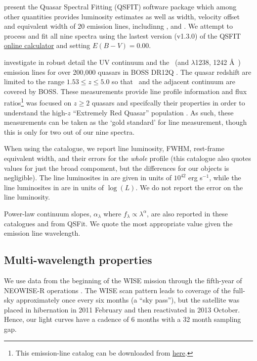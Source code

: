 \documentclass[a4paper,fleqn,usenatbib]{mnras}
\begin{document}
\citet{Calderone2017} present the Quasar Spectral Fitting (QSFIT)
software package which among other quantities provides luminosity
estimates as well as width, velocity offset and equivalent width of 20
emission lines, includinng \civ, \ciii and \mgii.  We attempt to process and fit
all nine spectra using the lastest version (v1.3.0) of the QSFIT
\href{https://qsfit.inaf.it/cat_1.30/onlinefit.php}{online calculator}
and setting $E(B-V)=0.00$.

\citet{Hamann2017} investigate in robust detail the UV continuum and
the \civ\ (and \nv $\lambda$1238, 1242 \AA\ ) emission lines for over
200,000 quasars in BOSS DR12Q \citep{Paris2017}.  The quasar redshift
are limited to the range $1.53 \leq z \leq 5.0$ so that \civ\ and the
adjacent continuum are covered by BOSS. These measurements provide
line profile information and flux ratios\footnote{This emission-line
catalog can be downloaded from
\href{https://datadryad.org/stash/dataset/doi:10.6086/D1H59V}{here}.}
\citet{Hamann2017} was focused on $z\geq2$ quasars and specifcally
their \civ properties in order to understand the high-$z$ ``Extremely
Red Quasar'' population \citet{Ross2015, Zakamska2016, Perrotta2019,
Zakamska2019}.  As such, these measurements can be taken as the `gold
standard' for \civ line measurement, though this is only for two out of
our nine spectra.

 When using the \citet{Shen2011} catalogue, we report line luminosity,
FWHM, rest-frame equivalent width, and their errors for the {\it
whole} \mgii profile (this catalogue also quotes values for just the
broad \mgii compoment, but the differences for our objects is
negligible). The line luminosites in \citet{Calderone2017} are given
in units of $10^{42}$ erg s$^{-1}$, while the line luminosites in
\citet{Shen2011} are in units of $\log(L)$.  We do not report
the \citet{Shen2011} error on the line luminosity.

Power-law continuum slopes, $\alpha_{\lambda}$ where $f_{\lambda}
\propto \lambda^{\alpha}$, are also reported in these catalogues and
from QSFit.  We quote the most appropriate value given the emission
line wavelength.

\subsection{Multi-wavelength properties}
We use data from the beginning of the WISE mission \citep[2010
January; ][]{Wright2010} through the fifth-year of NEOWISE-R
operations \citep[2018 December; ][]{Mainzer2011}. The WISE scan
pattern leads to coverage of the full-sky approximately once every six
months (a ``sky pass''), but the satellite was placed in hibernation
in 2011 February and then reactivated in 2013 October. Hence, our
light curves have a cadence of 6 months with a 32 month sampling gap.
\end{document}
